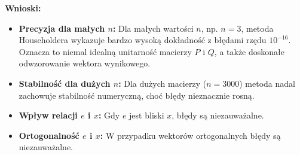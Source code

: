 \textbf{Wnioski:}
\begin{itemize}
    \item \textbf{Precyzja dla małych \( n \):} Dla małych wartości \( n \), np. \( n = 3 \), metoda Householdera wykazuje bardzo wysoką dokładność z błędami rzędu \( 10^{-16} \). Oznacza to niemal idealną unitarność macierzy \( P \) i \( Q \), a także doskonałe odwzorowanie wektora wynikowego.  
    \item \textbf{Stabilność dla dużych \( n \):} Dla dużych macierzy (\( n = 3000 \)) metoda nadal zachowuje stabilność numeryczną, choć błędy nieznacznie rosną.  
    \item \textbf{Wpływ relacji \( e \) i \( x \):} Gdy \( e \) jest bliski \( x \), błędy są niezauważalne. 
    \item \textbf{Ortogonalność \( e \) i \( x \):} W przypadku wektorów ortogonalnych błędy są niezauważalne. 

\end{itemize}

